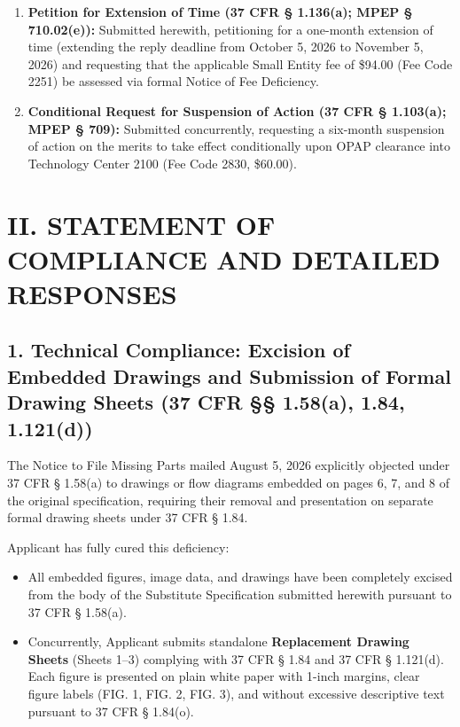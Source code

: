 \documentclass[11pt,letterpaper]{article}
\begin{document}
\begin{enumerate}[leftmargin=2em, itemsep=3pt, parsep=0pt]
    \item \textbf{Petition for Extension of Time (37 CFR \S{} 1.136(a); MPEP \S{} 710.02(e)):} Submitted herewith, petitioning for a one-month extension of time (extending the reply deadline from October 5, 2026 to November 5, 2026) and requesting that the applicable Small Entity fee of \$94.00 (Fee Code 2251) be assessed via formal Notice of Fee Deficiency.
    \item \textbf{Conditional Request for Suspension of Action (37 CFR \S{} 1.103(a); MPEP \S{} 709):} Submitted concurrently, requesting a six-month suspension of action on the merits to take effect conditionally upon OPAP clearance into Technology Center 2100 (Fee Code 2830, \$60.00).
\end{enumerate}

\newpage

\section*{II. STATEMENT OF COMPLIANCE AND DETAILED RESPONSES}

\subsection*{1. Technical Compliance: Excision of Embedded Drawings and Submission of Formal Drawing Sheets (37 CFR \S\S{} 1.58(a), 1.84, 1.121(d))}

The Notice to File Missing Parts mailed August 5, 2026 explicitly objected under 37 CFR \S{} 1.58(a) to drawings or flow diagrams embedded on pages 6, 7, and 8 of the original specification, requiring their removal and presentation on separate formal drawing sheets under 37 CFR \S{} 1.84.

Applicant has fully cured this deficiency:
\begin{itemize}[leftmargin=2em, itemsep=2pt, parsep=0pt]
    \item All embedded figures, image data, and drawings have been completely excised from the body of the Substitute Specification submitted herewith pursuant to 37 CFR \S{} 1.58(a).
    \item Concurrently, Applicant submits standalone \textbf{Replacement Drawing Sheets} (Sheets 1--3) complying with 37 CFR \S{} 1.84 and 37 CFR \S{} 1.121(d). Each figure is presented on plain white paper with 1-inch margins, clear figure labels (FIG. 1, FIG. 2, FIG. 3), and without excessive descriptive text pursuant to 37 CFR \S{} 1.84(o).
\end{itemize}
\end{document}
